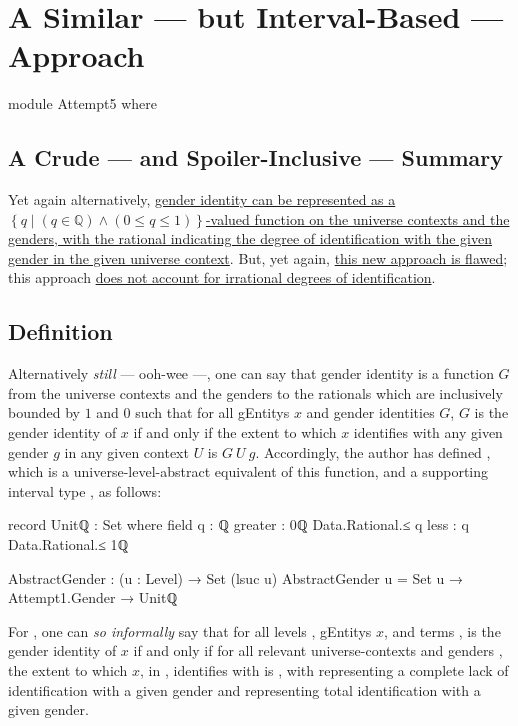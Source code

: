 \documentclass{article}
\theoremstyle{remark}
\newcommand{\summaryLink}[2]{\hyperref[#1]{#2}}
\begin{document}
\section{A Similar --- but Interval-Based --- Approach}\label{sec:gender5}

\begin{code}
module Attempt5 where
\end{code}

\subsection{A Crude --- and Spoiler-Inclusive --- Summary}
Yet again alternatively, \summaryLink{sec:gender5definition}{gender identity can be represented as a \(\left\{q \mid \left(q \in \mathbb{Q}\right) \land \left(0 \leq q \leq 1\right)\right\}\)-valued function on the universe contexts and the genders, with the rational indicating the degree of identification with the given gender in the given universe context}.  But, yet again, \summaryLink{sec:gender5flaws}{this new approach is flawed}; this approach \summaryLink{enum:gender5flawsIrrational}{does not account for irrational degrees of identification}.

\subsection{Definition}\label{sec:gender5definition}
Alternatively \emph{still} --- ooh-wee ---, one can say that gender identity is a function \(G\) from the universe contexts and the genders to the rationals which are inclusively bounded by \(1\) and \(0\) such that for all \glspl{gEntity} \(x\) and gender identities \(G\), \(G\) is the gender identity of \(x\) if and only if the extent to which \(x\) identifies with any given gender \(g\) in any given context \(U\) is \(G\ U\ g\).  Accordingly, the author has defined , which is a universe-level-abstract equivalent of this function, and a supporting interval type , as follows:

\begin{code}
  record Unitℚ : Set where
    field
      q : ℚ
      greater : 0ℚ Data.Rational.≤ q
      less : q Data.Rational.≤ 1ℚ

  AbstractGender : (u : Level) → Set (lsuc u)
  AbstractGender u = Set u → Attempt1.Gender → Unitℚ
\end{code}

For , one can \emph{so informally} say that for all levels , \glspl{gEntity} \(x\), and   terms ,  is the gender identity of \(x\) if and only if for all relevant universe-contexts  and genders , the extent to which \(x\), in , identifies with  is   , with  representing a complete lack of identification with a given gender and  representing total identification with a given gender.
\end{document}
